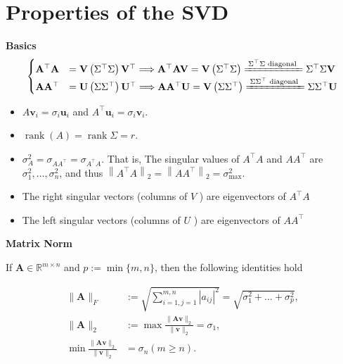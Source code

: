 \documentclass[14pt]{article}
\theoremstyle{definition}
\theoremstyle{remark}
\begin{document}
\section*{Properties of the SVD}
\begin{multicols*}{2}

\textbf{Basics}
$$
    \begin{cases}
        \mathbf{A}^\top\mathbf{A} &=\mathbf{V}\left(\Sigma^\top \Sigma\right) \mathbf{V}^\top \Longrightarrow \mathbf{A}^\top \mathbf{A}\mathbf{V} = \mathbf{V}\left(\Sigma^\top \Sigma\right) \xlongequal{\Sigma^\top \Sigma \text{ diagonal }}\Sigma^\top \Sigma \mathbf{V}\\
        \mathbf{A}\mathbf{A}^\top &=\mathbf{U}\left(\Sigma \Sigma^\top\right) \mathbf{U}^\top \Longrightarrow \mathbf{A} \mathbf{A}^\top\mathbf{U} = \mathbf{V}\left(\Sigma \Sigma^\top\right) \xlongequal{\Sigma \Sigma^\top \text{ diagonal }}\Sigma \Sigma^\top \mathbf{U}
    \end{cases}
$$
\begin{itemize}
    \item $ A \mathbf{v}_{i}=\sigma_{i} \mathbf{u}_{i}$ and $A^{\top} \mathbf{u}_{i}=\sigma_{i} \mathbf{v}_{i}$.
    \item $\operatorname{rank}(A)=\operatorname{rank}\Sigma = r$.
    \item $\sigma_A^2 = \sigma_{A A^{\top}} = \sigma_{A^{\top} A}$. That is, The singular values of
          $A^\top A$ and $A A^\top$ are $\sigma_1^2, \ldots, \sigma_n^2$, and thus $\left\|A^\top A\right\|_2 = \left\|A A^\top\right\|_2=\sigma_{\max }^2$.
    \item The right singular vectors (columns of $V$ ) are eigenvectors of $A^{\top} A$
    \item The left singular vectors (columns of $U$ ) are eigenvectors of $A A^{\top}$
\end{itemize}

\textbf{Matrix Norm}

    If $\mathbf{A} \in \mathbb{R}^{m \times n}$ and $p:=\min \{m, n\}$, then the following identities hold

    $$
        \begin{aligned}
            \|\mathbf{A}\|_{F}                                            & :=\sqrt{\sum_{i=1, j=1}^{m, n}\left|a_{i j}\right|^{2}}=\sqrt{\sigma_{1}^{2}+\ldots+\sigma_{p}^{2}}, \\
            \|\mathbf{A}\|_{2}                                            & :=\max \frac{\|\mathbf{A} \mathbf{v}\|_{2}}{\|\mathbf{v}\|_{2}}=\sigma_{1},                          \\
            \min \frac{\|\mathbf{A} \mathbf{v}\|_{2}}{\|\mathbf{v}\|_{2}} & =\sigma_{n}(m \geq n) .
        \end{aligned}
    $$


\end{multicols*}
\end{document}
